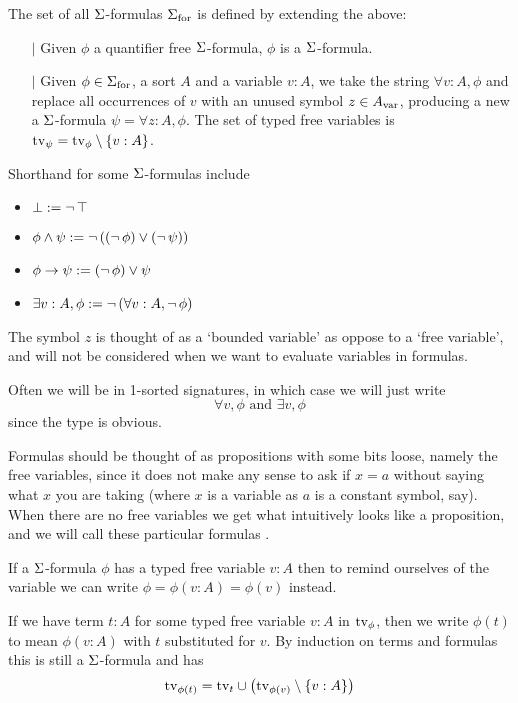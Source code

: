 \begin{dfn}
    The set of all $\Sigma$-formulas ${\Sigma}_\mathrm{for}$ 
    is defined by extending the above:
    \begin{itemize}
        \item[$\vert$] Given $\phi$ a quantifier free $\Sigma$-formula,
        $\phi$ is a $\Sigma$-formula.
        \item[$\vert$] Given $\phi \in {\Sigma}_\mathrm{for}$, a sort $A$
        and a variable $v : A$, we take the string $\forall v : A, \phi$ and
        replace all occurrences of
        $v$ with an unused symbol
        $z \in {A}_\mathrm{var}$,
        producing a new a $\Sigma$-formula $\psi = \forall z : A, \phi$.
        The set of typed free variables is 
        $\textrm{tv}_{\psi} = \textrm{tv}_{\phi} \setminus \left\{v : A\right\}$.
    \end{itemize}
    Shorthand for some $\Sigma$-formulas include 
    \begin{itemize}
        \item $\bot := \neg\, \top$
        \item $\phi \land \psi := \neg\,((\neg\,\phi) \lor (\neg\,\psi))$
        \item $\phi \to \psi := (\neg\,\phi) \lor \psi$
        \item $\exists v : A, \phi := \neg\,(\forall v : A, \neg\,\phi)$
    \end{itemize}
    
    The symbol $z$ is thought of as a `bounded variable' as oppose to 
    a `free variable', 
    and will not be considered when we want to evaluate
    variables in formulas.
    
    Often we will be in 1-sorted signatures, 
    in which case we will just write 
    \[
        \forall v, \phi \text{ and } \exists v, \phi
    \]
    since the type is obvious.
\end{dfn}
\begin{rmk}
    Formulas should be thought of as propositions with some bits loose, 
    namely the free variables, since it does not make any sense to ask if 
    $x = a$ without saying what $x$ you are taking
    (where $x$ is a variable as $a$ is a constant symbol, say).
    When there are no free variables we get what intuitively looks like a 
    proposition, and we will call these particular formulas .
\end{rmk}

\begin{dfn}
    If a $\Sigma$-formula $\phi$ has a typed free variable $v : A$ 
    then to remind ourselves of the variable we can write 
    $\phi = \phi(v : A) = \phi(v)$ instead.

    If we have term $t : A$ for some typed free variable $v : A$
    in $\textrm{tv}_{\phi}$, 
    then we write $\phi(t)$ to mean $\phi(v : A)$ with 
    $t$ substituted for $v$.
    By induction on terms and formulas this is still a 
    $\Sigma$-formula and has 
    \[\textrm{tv}_{\phi(t)} = \textrm{tv}_{t} \cup \left(\textrm{tv}_{\phi(v)} \setminus \left\{v : A\right\}\right)\]
\end{dfn}

